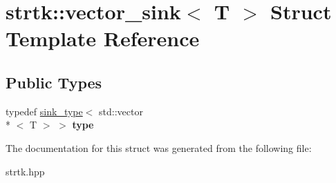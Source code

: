 \hypertarget{structstrtk_1_1vector__sink}{\section{strtk\-:\-:vector\-\_\-sink$<$ T $>$ Struct Template Reference}
\label{structstrtk_1_1vector__sink}
}
\subsection*{Public Types}
\begin{DoxyCompactItemize}
\item 
\hypertarget{structstrtk_1_1vector__sink_a4848e96e2960f3fc8e9c3049ec3f4678}{typedef \hyperlink{classstrtk_1_1sink__type}{sink\-\_\-type}$<$ std\-::vector\\*
$<$ T $>$ $>$ {\bfseries type}}\label{structstrtk_1_1vector__sink_a4848e96e2960f3fc8e9c3049ec3f4678}

\end{DoxyCompactItemize}


The documentation for this struct was generated from the following file\-:\begin{DoxyCompactItemize}
\item 
strtk.\-hpp\end{DoxyCompactItemize}
